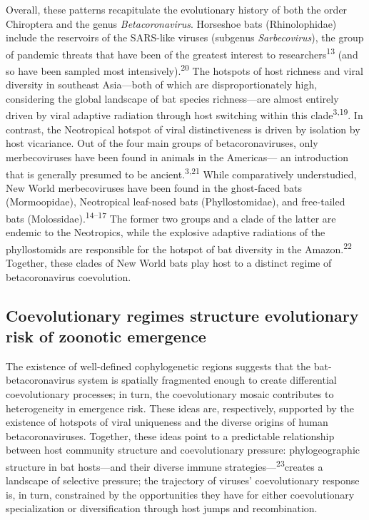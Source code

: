 \documentclass[11pt]{article}
\begin{document}
Overall, these patterns recapitulate the evolutionary history of both
the order Chiroptera and the genus \emph{Betacoronavirus}. Horseshoe
bats (Rhinolophidae) include the reservoirs of the SARS-like viruses
(subgenus \emph{Sarbecovirus}), the group of pandemic threats that have
been of the greatest interest to researchers\textsuperscript{13} (and so
have been sampled most intensively).\textsuperscript{20} The hotspots of
host richness and viral diversity in southeast Asia---both of which are
disproportionately high, considering the global landscape of bat species
richness---are almost entirely driven by viral adaptive radiation
through host switching within this clade\textsuperscript{3,19}. In
contrast, the Neotropical hotspot of viral distinctiveness is driven by
isolation by host vicariance. Out of the four main groups of
betacoronaviruses, only merbecoviruses have been found in animals in the
Americas--- an introduction that is generally presumed to be
ancient.\textsuperscript{3,21} While comparatively understudied, New
World merbecoviruses have been found in the ghost-faced bats
(Mormoopidae), Neotropical leaf-nosed bats (Phyllostomidae), and
free-tailed bats (Molossidae).\textsuperscript{14--17} The former two
groups and a clade of the latter are endemic to the Neotropics, while
the explosive adaptive radiations of the phyllostomids are responsible
for the hotspot of bat diversity in the Amazon.\textsuperscript{22}
Together, these clades of New World bats play host to a distinct regime
of betacoronavirus coevolution.

\hypertarget{coevolutionary-regimes-structure-evolutionary-risk-of-zoonotic-emergence}{%
\subsection{Coevolutionary regimes structure evolutionary risk of
zoonotic
emergence}\label{coevolutionary-regimes-structure-evolutionary-risk-of-zoonotic-emergence}}

The existence of well-defined cophylogenetic regions suggests that the
bat-betacoronavirus system is spatially fragmented enough to create
differential coevolutionary processes; in turn, the coevolutionary
mosaic contributes to heterogeneity in emergence risk. These ideas are,
respectively, supported by the existence of hotspots of viral uniqueness
and the diverse origins of human betacoronaviruses. Together, these
ideas point to a predictable relationship between host community
structure and coevolutionary pressure: phylogeographic structure in bat
hosts---and their diverse immune
strategies---\textsuperscript{23}creates a landscape of selective
pressure; the trajectory of viruses' coevolutionary response is, in
turn, constrained by the opportunities they have for either
coevolutionary specialization or diversification through host jumps and
recombination.
\end{document}
